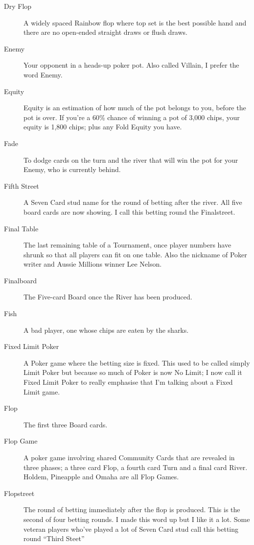 \begin{description}
\item[Dry Flop] A widely spaced Rainbow flop where top set is the best
possible hand and there are no open-ended straight draws or flush
draws.

\item[Enemy] Your opponent in a heads-up poker pot. Also called
Villain, I prefer the word Enemy.

\item[Equity] Equity is an estimation of how much of the pot belongs
to you, before the pot is over. If you're a 60\% chance of winning a
pot of 3,000 chips, your equity is 1,800 chips; plus any Fold Equity
you have.

\item[Fade] To dodge cards on the turn and the river that will win the
pot for your Enemy, who is currently behind.

\item[Fifth Street] A Seven Card stud name for the round of betting
after the river. All five board cards are now showing. I call this betting
round the Finalstreet.

\item[Final Table] The last remaining table of a Tournament, once
player numbers have shrunk so that all players can fit on one
table. Also the nickname of Poker writer and Aussie Millions winner
Lee Nelson.

\item[Finalboard] The Five-card Board once the River has been
produced.

\item[Fish] A bad player, one whose chips are eaten by the sharks.

\item[Fixed Limit Poker] A Poker game where the betting size is
fixed. This used to be called simply Limit Poker but because so much
of Poker is now No Limit; I now call it Fixed Limit Poker to really
emphasise that I'm talking about a Fixed Limit game.

\item[Flop] The first three Board cards.

\item[Flop Game] A poker game involving shared Community Cards that
are revealed in three phases; a three card Flop, a fourth card Turn
and a final card River. Holdem, Pineapple and Omaha are all Flop
Games.

\item[Flopstreet] The round of betting immediately after the flop is
produced. This is the second of four betting rounds. I made this word
up but I like it a lot. Some veteran players who've played a lot of
Seven Card stud call this betting round ``Third Steet''


\end{description}
